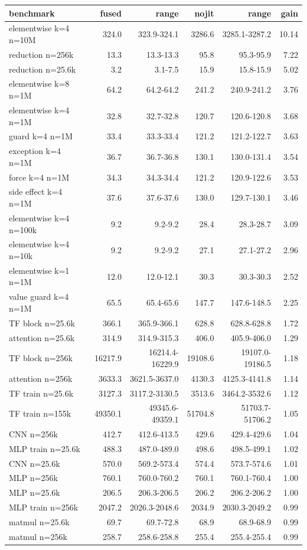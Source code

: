 \begin{tabular}{lrrrrr}
\toprule
benchmark & fused & range & nojit & range & gain \\
\midrule
elementwise k=4 n=10M & 324.0 & 323.9-324.1 & 3286.6 & 3285.1-3287.2 & 10.14 \\
reduction n=256k & 13.3 & 13.3-13.3 & 95.8 & 95.3-95.9 & 7.22 \\
reduction n=25.6k & 3.2 & 3.1-7.5 & 15.9 & 15.8-15.9 & 5.02 \\
elementwise k=8 n=1M & 64.2 & 64.2-64.2 & 241.2 & 240.9-241.2 & 3.76 \\
elementwise k=4 n=1M & 32.8 & 32.7-32.8 & 120.7 & 120.6-120.8 & 3.68 \\
guard k=4 n=1M & 33.4 & 33.3-33.4 & 121.2 & 121.2-122.7 & 3.63 \\
exception k=4 n=1M & 36.7 & 36.7-36.8 & 130.1 & 130.0-131.4 & 3.54 \\
force k=4 n=1M & 34.3 & 34.3-34.4 & 121.2 & 120.9-122.6 & 3.53 \\
side effect k=4 n=1M & 37.6 & 37.6-37.6 & 130.0 & 129.7-130.1 & 3.46 \\
elementwise k=4 n=100k & 9.2 & 9.2-9.2 & 28.4 & 28.3-28.7 & 3.09 \\
elementwise k=4 n=10k & 9.2 & 9.2-9.2 & 27.1 & 27.1-27.2 & 2.96 \\
elementwise k=1 n=1M & 12.0 & 12.0-12.1 & 30.3 & 30.3-30.3 & 2.52 \\
value guard k=4 n=1M & 65.5 & 65.4-65.6 & 147.7 & 147.6-148.5 & 2.25 \\
TF block n=25.6k & 366.1 & 365.9-366.1 & 628.8 & 628.8-628.8 & 1.72 \\
attention n=25.6k & 314.9 & 314.9-315.3 & 406.0 & 405.9-406.0 & 1.29 \\
TF block n=256k & 16217.9 & 16214.4-16229.9 & 19108.6 & 19107.0-19186.5 & 1.18 \\
attention n=256k & 3633.3 & 3621.5-3637.0 & 4130.3 & 4125.3-4141.8 & 1.14 \\
TF train n=25.6k & 3127.3 & 3117.2-3130.5 & 3513.6 & 3464.2-3532.6 & 1.12 \\
TF train n=155k & 49350.1 & 49345.6-49359.1 & 51704.8 & 51703.7-51706.2 & 1.05 \\
CNN n=256k & 412.7 & 412.6-413.5 & 429.6 & 429.4-429.6 & 1.04 \\
MLP train n=25.6k & 488.3 & 487.0-489.0 & 498.6 & 498.5-499.1 & 1.02 \\
CNN n=25.6k & 570.0 & 569.2-573.4 & 574.4 & 573.7-574.6 & 1.01 \\
MLP n=256k & 760.1 & 760.0-760.2 & 760.1 & 760.1-760.4 & 1.00 \\
MLP n=25.6k & 206.5 & 206.3-206.5 & 206.2 & 206.2-206.2 & 1.00 \\
MLP train n=256k & 2047.2 & 2026.3-2048.6 & 2034.9 & 2030.3-2049.2 & 0.99 \\
matmul n=25.6k & 69.7 & 69.7-72.8 & 68.9 & 68.9-68.9 & 0.99 \\
matmul n=256k & 258.7 & 258.6-258.8 & 255.4 & 255.4-255.4 & 0.99 \\
\bottomrule
\end{tabular}
